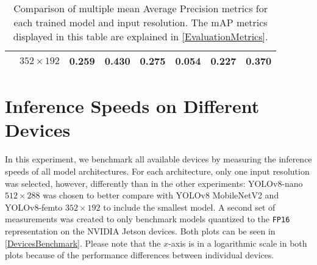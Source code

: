 \begin{table}
\begin{tabular}{|c|c|rrrrrr|}
        \cline{2-2}
                                     & \multirow{1}{*}{$352\times192$}  & 0.259 & 0.430 & 0.275 & 0.054 & 0.227 & 0.370 \\
        \hline
    \end{tabular}
    \caption{Comparison of multiple mean Average Precision metrics for each
    trained model and input resolution. The mAP metrics displayed in this table
    are explained in \autoref{EvaluationMetrics}.}
    \label{mAPTableSmall}
\end{table}






\section{Inference Speeds on Different Devices}



In this experiment, we benchmark all available devices by measuring the
inference speeds of all model architectures. For each architecture, only one
input resolution was selected, however, differently than in the other
experiments: YOLOv8-nano $512 \times 288$ was chosen to better compare with
YOLOv8 MobileNetV2 and YOLOv8-femto $352 \times 192$ to include the smallest
model. A second set of measurements was created to only benchmark models
quantized to the \texttt{FP16} representation on the NVIDIA Jetson devices. Both
plots can be seen in \autoref{DevicesBenchmark}. Please note that the $x$-axis is
in a logarithmic scale in both plots because of the performance differences
between individual devices.

